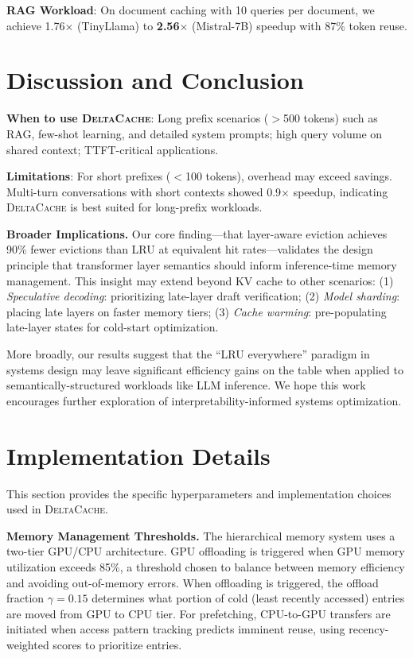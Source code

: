\documentclass{article}
\newcommand{\deltacache}{\textsc{DeltaCache}}
\begin{document}
\textbf{RAG Workload}: On document caching with 10 queries per document, we achieve 1.76$\times$ (TinyLlama) to \textbf{2.56$\times$} (Mistral-7B) speedup with 87\% token reuse.

\section{Discussion and Conclusion}

\textbf{When to use \deltacache{}}: Long prefix scenarios ($>$500 tokens) such as RAG, few-shot learning, and detailed system prompts; high query volume on shared context; TTFT-critical applications.

\textbf{Limitations}: For short prefixes ($<$100 tokens), overhead may exceed savings.
Multi-turn conversations with short contexts showed 0.9$\times$ speedup, indicating \deltacache{} is best suited for long-prefix workloads.

\textbf{Broader Implications.}
Our core finding---that layer-aware eviction achieves 90\% fewer evictions than LRU at equivalent hit rates---validates the design principle that transformer layer semantics should inform inference-time memory management.
This insight may extend beyond KV cache to other scenarios:
(1) \emph{Speculative decoding}: prioritizing late-layer draft verification;
(2) \emph{Model sharding}: placing late layers on faster memory tiers;
(3) \emph{Cache warming}: pre-populating late-layer states for cold-start optimization.

More broadly, our results suggest that the ``LRU everywhere'' paradigm in systems design may leave significant efficiency gains on the table when applied to semantically-structured workloads like LLM inference.
We hope this work encourages further exploration of interpretability-informed systems optimization.




\appendix
\section{Implementation Details}
\label{app:implementation}

This section provides the specific hyperparameters and implementation choices used in \deltacache{}.

\textbf{Memory Management Thresholds.}
The hierarchical memory system uses a two-tier GPU/CPU architecture.
GPU offloading is triggered when GPU memory utilization exceeds 85\%, a threshold chosen to balance between memory efficiency and avoiding out-of-memory errors.
When offloading is triggered, the offload fraction $\gamma = 0.15$ determines what portion of cold (least recently accessed) entries are moved from GPU to CPU tier.
For prefetching, CPU-to-GPU transfers are initiated when access pattern tracking predicts imminent reuse, using recency-weighted scores to prioritize entries.
\end{document}
